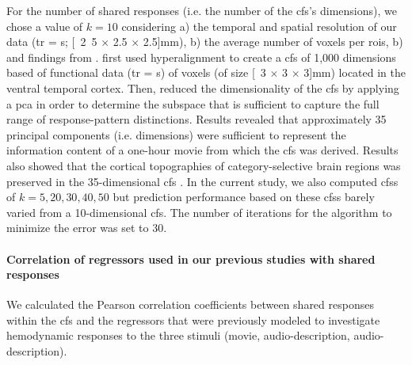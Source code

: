 For the number of shared responses (i.e. the number of the \ac{cfs}'s
dimensions), we chose a value of $k=10$ considering a) the temporal and spatial
resolution of our data (\ac{tr} = \unit[2]{s}; \unit[2.5 $\times$ 2.5 $\times$
2.5]{mm}), b) the average number of voxels per \acp{roi}, b) and findings from
\citet{haxby2011common}.
%
\citet{haxby2011common} first used hyperalignment to create a \ac{cfs} of 1,000
dimensions based of functional data (\ac{tr} = \unit[3]{s}) of voxels (of size
\unit[3 $\times$ 3 $\times$ 3]{mm}) located in the ventral temporal cortex.
%
Then, \citet{haxby2011common} reduced the dimensionality of the \ac{cfs} by
applying a \ac{pca} in order to determine the subspace that is sufficient to
capture the full range of response-pattern distinctions.
%
Results revealed that approximately 35 principal components (i.e. dimensions)
were sufficient to represent the information content of a one-hour movie from
which the \ac{cfs} was derived.
%
Results also showed that the cortical topographies of category-selective brain
regions was preserved in the 35-dimensional \ac{cfs} \citep{haxby2011common}.
%
In the current study, we also computed \acp{cfs} of $k=5, 20, 30, 40, 50$ but
prediction performance based on these \acp{cfs} barely varied from a
10-dimensional \ac{cfs}.
The number of iterations for the algorithm to minimize the error was set to 30.



\paragraph{Correlation of regressors used in our previous studies with shared
responses}




We calculated the Pearson correlation coefficients between shared responses
within the \ac{cfs} and the regressors that were previously modeled
\citep{sengupta2016extension, haeusler2022processing} to investigate hemodynamic
responses to the three stimuli (movie, audio-description, audio-description).


